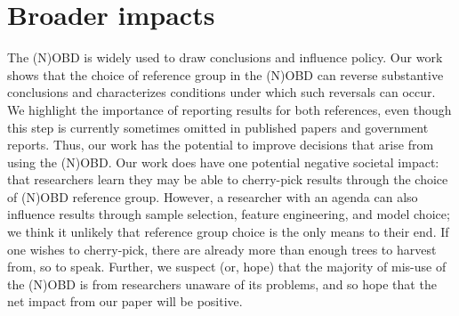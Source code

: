 



\section*{Broader impacts}
The (N)OBD is widely used to draw conclusions and influence policy.
Our work shows that the choice of reference group in the (N)OBD can reverse substantive conclusions and characterizes conditions under which such reversals can occur.
We highlight the importance of reporting results for both references, even though this step is currently sometimes omitted in published papers
and government reports.
Thus, our work has the potential to improve decisions that arise from using the (N)OBD.
Our work does have one potential negative societal impact: that researchers learn they may be able to cherry-pick results through the choice of (N)OBD reference group.
However, a researcher with an agenda can also influence results through sample selection, feature engineering, and model choice; we think it unlikely that reference group choice is the only means to their end.
If one wishes to cherry-pick, there are already more than enough trees to harvest from, so to speak.
Further, we suspect (or, hope) that the majority of mis-use of the (N)OBD is from researchers unaware of its problems, and so hope that the net impact from our paper will be positive.

\appendix






